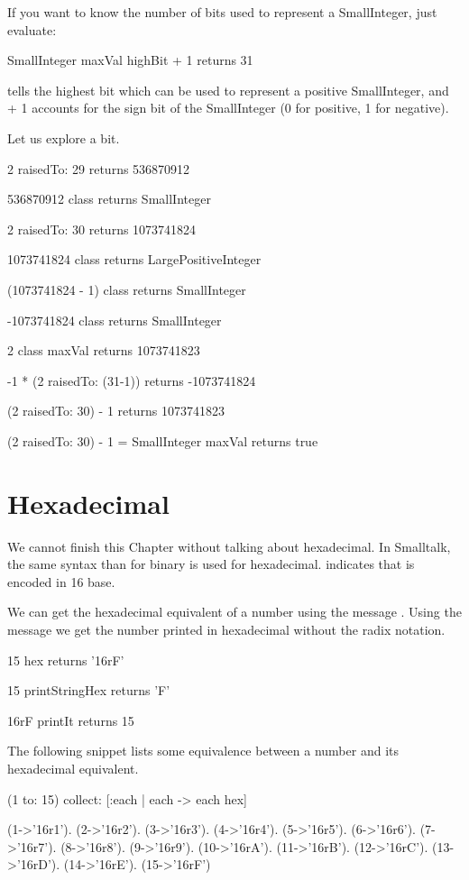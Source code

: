 \documentclass[a4paper,10pt,twoside]{book}
\begin{document}
If you want to know the number of bits used to represent a
SmallInteger, just evaluate:

\begin{code}{}
SmallInteger maxVal highBit + 1
	returns 31
\end{code}

 tells the highest bit which can be used to
represent a positive SmallInteger, and + 1 accounts for the sign bit
of the SmallInteger (0 for positive, 1 for negative).


Let us explore a bit. 

\begin{code}{}
2 raisedTo: 29 
	returns 536870912 

536870912 class
	returns SmallInteger

2 raisedTo: 30 
	returns 1073741824

1073741824 class
	returns LargePositiveInteger
	
(1073741824 - 1) class
	returns SmallInteger

-1073741824 class 
	returns SmallInteger

2 class maxVal 
	returns 1073741823

-1 * (2 raisedTo: (31-1)) 
	returns -1073741824
	
(2 raisedTo: 30) - 1
	returns 1073741823
	
(2 raisedTo: 30) - 1 = SmallInteger maxVal	
	returns true
\end{code}

\section{Hexadecimal}
We cannot finish this Chapter without talking about hexadecimal. In Smalltalk, the same syntax than for binary is used for hexadecimal.  indicates that  is encoded in 16 base. 

We can get the hexadecimal equivalent of a number using the message . 
Using the message  we get the number printed in hexadecimal without the radix notation. 

\begin{code}{}
15 hex
	returns '16rF'
	
15 printStringHex 
	returns 'F'

16rF printIt
	returns 15
\end{code}

The following snippet lists some equivalence between a number and its hexadecimal equivalent.
\begin{code}
(1 to: 15) collect: [:each | each -> each hex] 

{(1->'16r1'). (2->'16r2'). (3->'16r3'). (4->'16r4'). (5->'16r5'). (6->'16r6'). (7->'16r7'). (8->'16r8'). (9->'16r9'). (10->'16rA'). (11->'16rB'). (12->'16rC'). (13->'16rD'). (14->'16rE'). (15->'16rF')}
\end{code}
\end{document}
